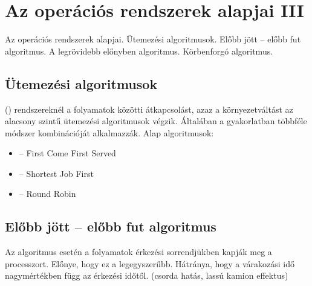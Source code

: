 \documentclass[../main.tex]{subfiles}
\begin{document}
\section{Az operációs rendszerek alapjai III}

\begin{fulltheorem}
	Az operációs rendszerek alapjai. Ütemezési algoritmusok.
	Előbb jött -- előbb fut algoritmus. A legrövidebb előnyben algoritmus.
	Körbenforgó algoritmus.
\end{fulltheorem}

\subsection{Ütemezési algoritmusok}

 () rendszereknél a folyamatok közötti
átkapcsolást, azaz a környezetváltást az alacsony szintű ütemezési algoritmusok
végzik. Általában a gyakorlatban többféle módszer kombinációját alkalmazzák.
Alap algoritmusok:
\begin{itemize}
	\item {} \tabto{1.2cm} – \tabto{1.8cm}
	      First Come First Served

	\item {} \tabto{1.1cm} – \tabto{1.8cm}
	      Shortest Job First

	\item {} \tabto{1cm} – \tabto{1.8cm}
	      Round Robin
\end{itemize}

\subsection{Előbb jött -- előbb fut algoritmus}

Az  algoritmus esetén a folyamatok érkezési sorrendjükben kapják meg
a processzort. Előnye, hogy ez a legegyszerűbb. Hátránya, hogy a várakozási
idő nagymértékben függ az érkezési időtől.
(csorda hatás, lassú kamion effektus)
\end{document}
